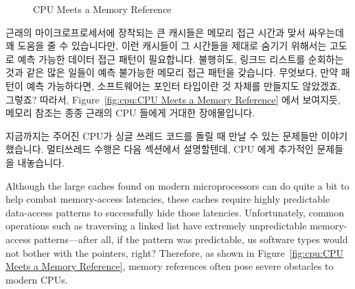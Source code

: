 \begin{figure}[htb]
\centering
{}
\caption{CPU Meets a Memory Reference}
\end{figure}

근래의 마이크로프로세서에 장착되는 큰 캐시들은 메모리 접근 시간과 맞서 싸우는데
꽤 도움을 줄 수 있습니다만, 이런 캐시들이 그 시간들을 제대로 숨기기 위해서는
고도로 예측 가능한 데이터 접근 패턴이 필요합니다.
불행히도, 링크드 리스트를 순회하는 것과 같은 많은 일들이 예측 불가능한 메모리
접근 패턴을 갖습니다. 무엇보다, 만약 패턴이 예측 가능하다면, 소프트웨어는
포인터 타입이란 것 자체를 만들지도 않았겠죠, 그렇죠?
따라서, Figure~\ref{fig:cpu:CPU Meets a Memory Reference} 에서 보여지듯, 메모리
참조는 종종 근래의 CPU 들에게 거대한 장애물입니다.

지금까지는 주어진 CPU가 싱글 쓰레드 코드를 돌릴 때 만날 수 있는 문제들만
이야기했습니다.
멀티쓰레드 수행은 다음 섹션에서 설명할텐데, CPU 에게 추가적인 문제들을
내놓습니다.
\iffalse

Although the large caches found on modern microprocessors can do quite
a bit to help combat memory-access latencies,
these caches require highly predictable data-access patterns to
successfully hide those latencies.
Unfortunately, common operations such as traversing a linked list
have extremely unpredictable memory-access patterns---after all,
if the pattern was predictable, us software types would not bother
with the pointers, right?
Therefore, as shown in
Figure~\ref{fig:cpu:CPU Meets a Memory Reference},
memory references often pose severe obstacles to modern CPUs.

